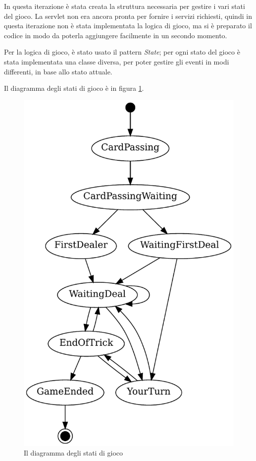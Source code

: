 \documentclass[a4paper,12pt,final]{article}
\begin{document}
In questa iterazione \`e stata creata la struttura necessaria per gestire
i vari stati del gioco. La servlet non era ancora pronta per fornire i servizi
richiesti, quindi in questa iterazione non \`e stata implementata la logica di
gioco, ma si \`e preparato il codice in modo da poterla aggiungere facilmente
in un secondo momento.

Per la logica di gioco, \`e stato usato il pattern \emph{State}; per ogni
stato del gioco \`e stata implementata una classe diversa, per poter gestire
gli eventi in modi differenti, in base allo stato attuale.

Il diagramma degli stati di gioco \`e in figura \ref{fig:stati di gioco}.

\begin{figure}
  \begin{center}
    \includegraphics[scale=0.5]{states}
  \end{center}
  \caption{Il diagramma degli stati di gioco}
  \label{fig:stati di gioco}
\end{figure}
\end{document}
